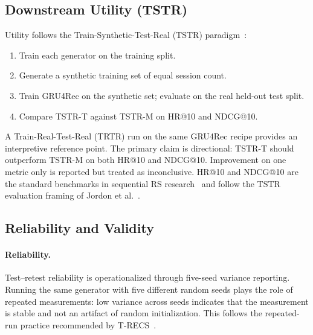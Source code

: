 \documentclass[sigconf,nonacm]{acmart}
\begin{document}
\subsection{Downstream Utility (TSTR)}
\label{sec:tstr}
Utility follows the Train-Synthetic-Test-Real (TSTR)
paradigm~\cite{jordon2022synthetic}:
\begin{enumerate}[leftmargin=*]
  \item Train each generator on the training split.
  \item Generate a synthetic training set of equal session count.
  \item Train GRU4Rec on the synthetic set; evaluate on the real
    held-out test split.
  \item Compare TSTR-T against TSTR-M on HR@10 and NDCG@10.
\end{enumerate}
A Train-Real-Test-Real (TRTR) run on the same GRU4Rec recipe provides
an interpretive reference point. The primary claim is directional:
TSTR-T should outperform TSTR-M on both HR@10 and NDCG@10. Improvement
on one metric only is reported but treated as inconclusive. HR@10 and
NDCG@10 are the standard benchmarks in sequential RS
research~\cite{hidasi2015gru4rec,kang2018sasrec,sun2019bert4rec} and follow the TSTR
evaluation framing of Jordon et al.~\cite{jordon2022synthetic}.


\subsection{Reliability and Validity}
\label{sec:reliability-validity}

\paragraph{Reliability.}
Test--retest reliability is operationalized through five-seed variance
reporting. Running the same generator with five different random seeds
plays the role of repeated measurements: low variance across seeds
indicates that the measurement is stable and not an artifact of random
initialization. This follows the repeated-run practice recommended by
T-RECS~\cite{lucherini2021trecs}.
\end{document}

